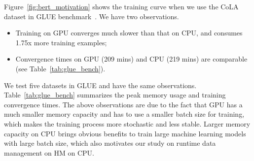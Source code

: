 \textcolor{check}{
Figure~\ref{fig:bert_motivation} shows the training curve when we use the CoLA dataset in GLUE benchmark~\cite{wang-etal-2018-glue}. We have two observations.}

\begin{itemize} %
    \item \textcolor{check}{Training on GPU converges much slower than that on CPU, and consumes 1.75x more training examples;}
    \item \textcolor{check}{Convergence times on GPU (209 mins) and CPU (219 mins) are comparable (see Table~\ref{tab:glue_bench})}. 
\end{itemize}

\textcolor{check}{
We test five datasets in GLUE and have the same observations. \textcolor{dong2}{Table~\ref{tab:glue_bench} summarizes the peak memory usage and training convergence times.} The above observations are due to the fact that GPU has a much smaller memory capacity and has to use a smaller batch size for training,
\textcolor{dong2}{which makes the training process more stochastic and less stable}. Larger memory capacity on CPU brings obvious benefits to train large machine learning models \textcolor{dong2}{with large batch size, which also motivates our study on runtime data management on HM on CPU}.
}




